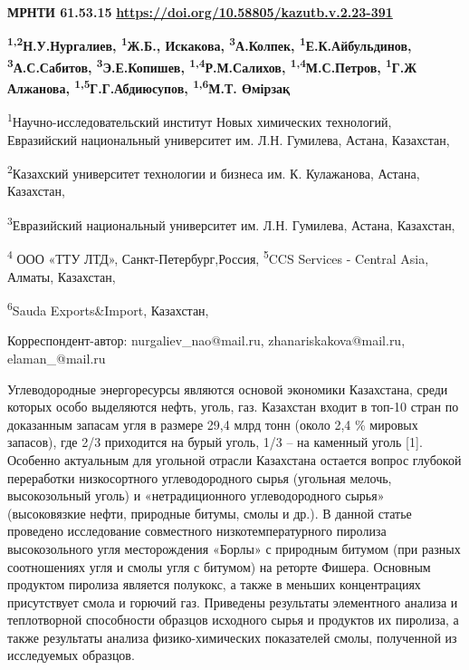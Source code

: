 \newpage
{}
{\bfseries МРНТИ 61.53.15}
\hfill {\bfseries \href{https://doi.org/10.58805/kazutb.v.2.23-391}{https://doi.org/10.58805/kazutb.v.2.23-391}}


\begin{center}
{\bfseries \textsuperscript{1,2}Н.У.Нургалиев\envelope, \textsuperscript{1}Ж.Б., Искакова\envelope, \textsuperscript{3}А.Колпек, \textsuperscript{1}Е.К.Айбульдинов\envelope, \textsuperscript{3}А.С.Сабитов, \textsuperscript{3}Э.Е.Копишев, \textsuperscript{1,4}Р.М.Салихов, \textsuperscript{1,4}М.С.Петров, \textsuperscript{1}Г.Ж Алжанова, \textsuperscript{1,5}Г.Г.Абдиюсупов, \textsuperscript{1,6}М.Т. Өмірзақ}

\textsuperscript{1}Научно-исследовательский институт Новых химических
технологий, Евразийский национальный университет им. Л.Н. Гумилева,
Астана, Казахстан,

\textsuperscript{2}Казахский университет технологии и бизнеса им. К.
Кулажанова, Астана, Казахстан,

\textsuperscript{3}Евразийский национальный университет им. Л.Н.
Гумилева, Астана, Казахстан,

\textsuperscript{4} ООО «ТТУ ЛТД», Санкт-Петербург,Россия,
\textsuperscript{5}CCS Services - Central Asia, Алматы, Казахстан,

\textsuperscript{6}Sauda Exports\&Import, Казахстан,

\envelope Корреспондент-автор: nurgaliev\_nao@mail.ru, zhanariskakova@mail.ru,
elaman\_@mail.ru
\end{center}

Углеводородные энергоре­сурсы являются основой экономики Казахстана,
среди которых особо выделяются нефть, уголь, газ. Казахстан входит в
топ-10 стран по доказанным запасам угля в размере 29,4 млрд тонн (около
2,4 \% мировых запасов), где 2/3 приходится на бурый уголь, 1/3 -- на
каменный уголь {[}1{]}. Особенно актуальным для угольной отрасли
Казахстана остается вопрос глубокой переработки низкосортного
углеводородного сырья (угольная мелочь, высокозольный уголь) и
«нетрадиционного углеводородного сырья» (высоковязкие нефти, природные
битумы, смолы и др.). В данной статье проведено исследование совместного
низкотемпературного пиролиза высокозольного угля месторождения «Борлы» с
природным битумом (при разных соотношениях угля и смолы угля с битумом)
на реторте Фишера. Основным продуктом пиролиза является полукокс, а
также в меньших концентрациях присутствует смола и горючий газ.
Приведены результаты элементного анализа и теплотворной способности
образцов исходного сырья и продуктов их пиролиза, а также результаты
анализа физико-химических показателей смолы, полученной из исследуемых
образцов.

